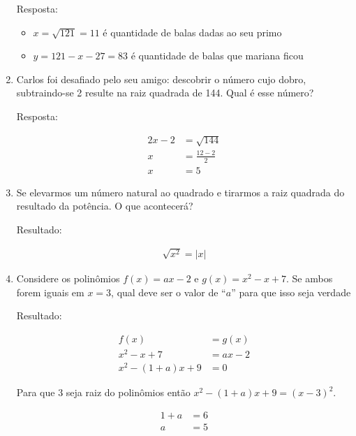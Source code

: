 \documentclass[12pt,onepage,a4paper]{memoir}
\begin{document}
\begin{enumerate}
    Resposta:

    \begin{itemize}
    \item   $x = \sqrt{121} = 11$  é quantidade de balas dadas ao seu primo
      \item $y = 121 - x  - 27 = 83$ é quantidade de balas que mariana ficou
      \end{itemize}


      
    \item Carlos foi desafiado pelo seu amigo: descobrir o número cujo dobro,
      subtraindo-se 2 resulte na  raiz quadrada de 144. Qual é esse
      número?

      Resposta:   

      \begin{align*}
        2x - 2 &= \sqrt{144} \\
        x & = \frac{12-2}{2} \\
        x & = 5
      \end{align*}
      

      \item Se elevarmos um número natural ao quadrado e tirarmos a raiz
        quadrada do resultado da potência. O que acontecerá?


        Resultado:

        \begin{align*}
          \sqrt{x^2} = |x|
        \end{align*}
       
        \item Considere os polinômios $f(x) = ax -2$ e $g(x) = x^2 - x + 7$. Se
          ambos forem iguais em $x=3$, qual deve ser o valor de “$a$” para que
          isso seja verdade

          Resultado:


       \begin{align*}
       f(x) &= g(x) \\
        x^2 - x + 7   & = ax - 2  \\
         x^2 -(1+a)x + 9 & = 0
      \end{align*}
      
      Para que $3$ seja raiz do polinômios então  $x^2 -(1+a)x + 9 = (x - 3)^2$.

        \begin{align*}
          1+a &= 6 \\
          a & = 5
        \end{align*}
      

\end{enumerate}
\end{document}
